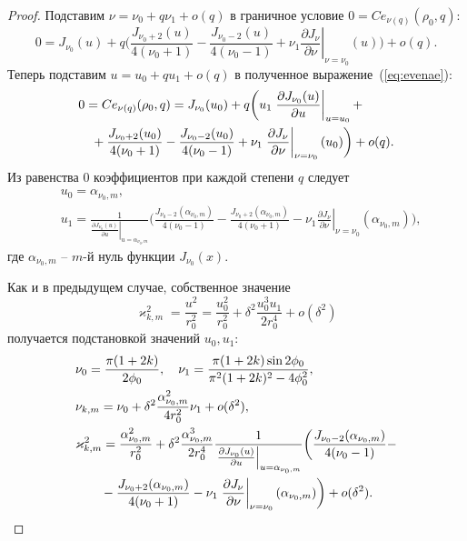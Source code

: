 \begin{proof}
Подставим  $\nu = \nu_0 + q \nu_1 + o(q)$  в граничное условие $0 = Ce_{\nu(q)}(\rho_0, q)$:
\begin{equation}
    0 = 
    J_{\nu_0}(u) + q \biggl( 
    \frac{J_{\nu_0+2}(u)}{4(\nu_0+1)}  - \frac{J_{\nu_0-2}(u)}{4(\nu_0-1)}
    + \nu_1 \left.\frac{\partial J_\nu}{\partial \nu}\right|_{\nu=\nu_0}(u)
    \biggr) + o(q).\label{eq:evenae}
\end{equation}
Теперь подставим $u = u_0 + q u_1 + o(q)$  в полученное выражение~(\ref{eq:evenae}):
\begin{align*}
    &0 =  Ce_{\nu(q)}(\rho_0, q) = 
    J_{\nu_0}(u_0) + q \biggl( 
    u_1 \left.\frac{\partial J_{\nu_0} (u)}{\partial u}\right|_{u=u_0} +  \notag \\
  &\quad{}  + \frac{J_{\nu_0+2}(u_0)}{4(\nu_0+1)} - \frac{J_{\nu_0-2}(u_0)}{4(\nu_0-1)}    + \nu_1 \left.\frac{\partial J_\nu}{\partial \nu}\right|_{\nu=\nu_0}(u_0)
    \biggr) + o(q).
\end{align*}
Из равенства $0$ коэффициентов при каждой степени $q$ следует
\begin{align*}
&u_0 = \alpha_{\nu_0, m}, \\
&u_1 = \frac{1}{\left.\frac{\partial J_{\nu_0} (u)}{\partial u}\right|_{u=\alpha_{\nu_0, m}}} 
\biggl(
\frac{J_{\nu_0-2}(\alpha_{\nu_0, m})}{4(\nu_0-1)} - \frac{J_{\nu_0+2}(\alpha_{\nu_0, m})}{4(\nu_0+1)}
 - \nu_1 \left.\frac{\partial J_\nu}{\partial \nu}\right|_{\nu=\nu_0}(\alpha_{\nu_0, m})
\biggr),
\end{align*}
где $\alpha_{\nu_0, m}$ -- $m$-й нуль функции $J_{\nu_0}(x)$.  

Как и в предыдущем случае, собственное значение
$$\varkappa_{k, m}^2 = \frac{u^2}{r_0^2} = \frac{u_0^2}{r_0^2} + \delta^2 \frac{u_0^3 u_1}{2r_0^4} + o(\delta^2)$$ получается подстановкой значений $u_0, u_1$:
\begin{align*}
&\nu_0 = \frac{\pi (1 + 2 k)}{2 \phi_0}, \quad \nu_1 = \frac{\pi (1+2k) \sin 2\phi_0}{\pi^2(1+2k)^2 - 4\phi_0^2},\\
& \nu_{k, m} = \nu_0 + \delta^2 \frac{\alpha_{\nu_0, m}^2}{4 r_0^2} \nu_1 + o(\delta^2), \\
&\varkappa_{k, m}^2 = \frac{\alpha_{\nu_0, m}^2}{r_0^2} + \delta^2 \frac{\alpha_{\nu_0, m}^3}{2r_0^4} \frac{1}{\left.\frac{\partial J_{\nu_0} (u)}{\partial u}\right|_{u=\alpha_{\nu_0, m}}}\biggl(
\frac{J_{\nu_0-2}(\alpha_{\nu_0, m})}{4(\nu_0-1)} - \notag\\
&\qquad{} - \frac{J_{\nu_0+2}(\alpha_{\nu_0, m})}{4(\nu_0+1)}    - \nu_1 \left.\frac{\partial J_\nu}{\partial \nu}\right|_{\nu=\nu_0}(\alpha_{\nu_0, m})
\biggr) + o(\delta^2).
\end{align*}


\end{proof}
